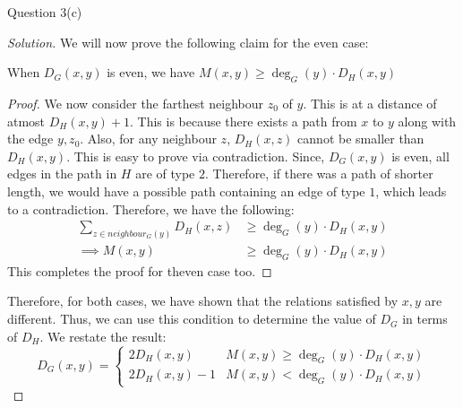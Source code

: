 \begin{solution}{Question 3(c)}
\begin{proof}[Solution]
      We will now prove the following claim for the even case:
      \begin{claim}
        When $D_G(x, y)$ is even, we have $M(x, y) \geq \deg_G(y) \cdot D_H(x, y)$
      \end{claim}
      \begin{proof}
        We now consider the farthest neighbour $z_0$ of $y$. This is at a distance of atmost $D_H(x, y) + 1$. This is because there exists a path from $x$ to $y$ along with the edge $y, z_0$. Also, for any neighbour $z$, $D_H(x, z)$ cannot be smaller than $D_H(x, y)$. This is easy to prove via contradiction. Since, $D_G(x, y)$ is even, all edges in the path in $H$ are of type $2$. Therefore, if there was a path of shorter length, we would have a possible path containing an edge of type $1$, which leads to a contradiction. Therefore, we have the following:
        \begin{equation}
          \begin{split}
            \sum_{z\in neighbour_G(y)} D_H(x, z) &\geq \deg_G(y) \cdot D_H(x, y)\\
            \implies M(x, y) &\geq \deg_G(y) \cdot D_H(x, y)
          \end{split}
        \end{equation}
        This completes the proof for theven case too.
      \end{proof}
      Therefore, for both cases, we have shown that the relations satisfied by $x, y$ are different. Thus, we can use this condition to determine the value of $D_G$ in terms of $D_H$. We restate the result:
        \begin{equation}
          D_G(x, y) = \begin{cases}
            2D_H(x, y) & M(x, y) \geq \deg_G(y) \cdot D_H(x, y)\\
            2D_H(x, y) - 1 & M(x, y) < \deg_G(y) \cdot D_H(x, y)
          \end{cases}
        \end{equation}
    \end{proof}
\end{solution}
